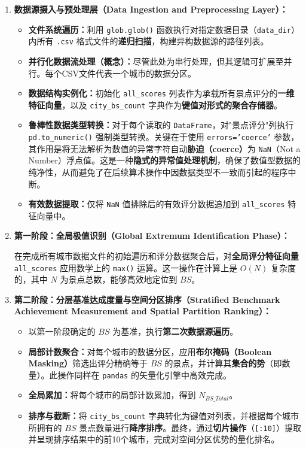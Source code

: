 \begin{enumerate}
    \item \textbf{数据源摄入与预处理层（Data Ingestion and Preprocessing Layer）：}
    \begin{itemize}
        \item \textbf{文件系统遍历：}利用 \texttt{glob.glob()} 函数执行对指定数据目录（\texttt{data\_dir}）内所有 \texttt{.csv} 格式文件的\textbf{递归扫描}，构建异构数据源的路径列表。
        \item \textbf{并行化数据流处理（概念）：}尽管此处为串行处理，但其逻辑可扩展至并行。每个CSV文件代表一个城市的数据分区。
        \item \textbf{数据结构实例化：}初始化 \texttt{all\_scores} 列表作为承载所有景点评分的\textbf{一维特征向量}，以及 \texttt{city\_bs\_count} 字典作为\textbf{键值对形式的聚合存储器}。
        \item \textbf{鲁棒性数据类型转换：}对于每个读取的 \texttt{DataFrame}，对"景点评分"列执行 \texttt{pd.to\_numeric()} 强制类型转换。关键在于使用 \texttt{errors='coerce'} 参数，其作用是将无法解析为数值的异常字符自动\textbf{胁迫（coerce）}为 \texttt{NaN}（Not a Number）浮点值。这是一种\textbf{隐式的异常值处理机制}，确保了数值型数据的纯净性，从而避免了在后续算术操作中因数据类型不一致而引起的程序中断。
        \item \textbf{有效数据提取：}仅将 \texttt{NaN} 值排除后的有效评分数据追加到 \texttt{all\_scores} 特征向量中。
    \end{itemize}

    \item \textbf{第一阶段：全局极值识别（Global Extremum Identification Phase）：}
    
    在完成所有城市数据文件的初始遍历和评分数据聚合后，对\textbf{全局评分特征向量} \texttt{all\_scores} 应用数学上的 \texttt{max()} 运算。这一操作在计算上是 $O(N)$ 复杂度的，其中 $N$ 为景点总数，能够高效地定位到 $BS$。

    \item \textbf{第二阶段：分层基准达成度量与空间分区排序（Stratified Benchmark Achievement Measurement and Spatial Partition Ranking）：}
    \begin{itemize}
        \item 以第一阶段确定的 $BS$ 为基准，执行\textbf{第二次数据源遍历}。
        \item \textbf{局部计数聚合：}对每个城市的数据分区，应用\textbf{布尔掩码（Boolean Masking）}筛选出评分精确等于 $BS$ 的景点，并计算其\textbf{集合的势}（即数量）。此操作同样在 \texttt{pandas} 的矢量化引擎中高效完成。
        \item \textbf{全局累加：}将每个城市的局部计数累加，得到 $N_{BS\_Total}$。
        \item \textbf{排序与截断：}将 \texttt{city\_bs\_count} 字典转化为键值对列表，并根据每个城市所拥有的 $BS$ 景点数量进行\textbf{降序排序}。最终，通过\textbf{切片操作}（\texttt{[:10]}）提取并呈现排序结果中的前10个城市，完成对空间分区优势的量化排名。
    \end{itemize}
\end{enumerate}

